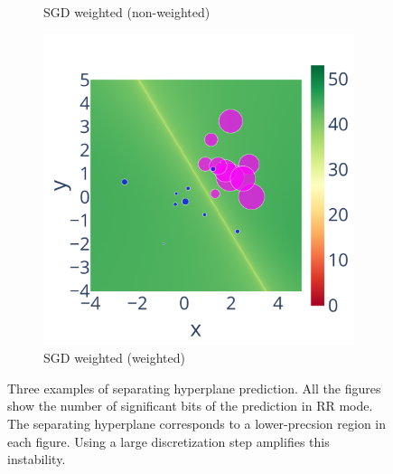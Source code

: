 \begin{figure}
\begin{subfigure}{.45\linewidth}
        \caption{SGD weighted (non-weighted)}
        \label{fig:weighted_nw_sig}
    \end{subfigure}
    \begin{subfigure}{.45\linewidth}
        \includegraphics[width=\linewidth]{figure/Weighted/weighted.pdf}
        \caption{SGD weighted (weighted)}
        \label{fig:weighted_w_sig}
    \end{subfigure}
    \caption{
        Three examples of separating hyperplane prediction. All the figures show the number of significant bits of the prediction in RR mode. The separating hyperplane corresponds to a lower-precsion region in each figure. Using a large discretization step amplifies
        this instability.
    }
    \label{fig:separating_hyperplan}
\end{figure}


